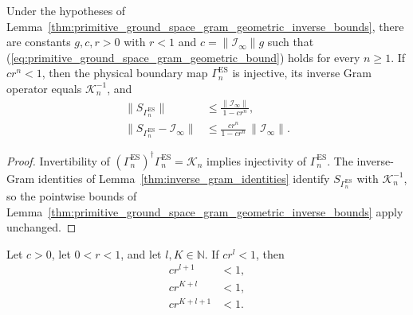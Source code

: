 \begin{lemma}
    \label{thm:primitive_ground_space_map_geometric_inverse_gram_bounds}
    \leanok
    Under the hypotheses of
    Lemma~\ref{thm:primitive_ground_space_gram_geometric_inverse_bounds},
    there are constants $g,c,r>0$ with $r<1$ and
    $c=\lVert\mathcal I_\infty\rVert g$ such that
    (\ref{eq:primitive_ground_space_gram_geometric_bound}) holds for every
    $n\geq1$.  If $cr^n<1$, then the physical boundary map
    $\Gamma_n^{\mathrm{ES}}$ is injective, its inverse Gram operator equals
    $\mathcal K_n^{-1}$, and
    \begin{align}
        \lVert S_{\Gamma_n^{\mathrm{ES}}}\rVert
         & \leq\frac{\lVert\mathcal I_\infty\rVert}{1-cr^n}, \\
        \lVert S_{\Gamma_n^{\mathrm{ES}}}-\mathcal I_\infty\rVert
         & \leq\frac{cr^n}{1-cr^n}\,
        \lVert\mathcal I_\infty\rVert.
    \end{align}
\end{lemma}

\begin{proof}
    \leanok
    Invertibility of
    $(\Gamma_n^{\mathrm{ES}})^\dagger\Gamma_n^{\mathrm{ES}}=\mathcal K_n$
    implies injectivity of $\Gamma_n^{\mathrm{ES}}$. The inverse-Gram
    identities of Lemma~\ref{thm:inverse_gram_identities}
    identify $S_{\Gamma_n^{\mathrm{ES}}}$ with $\mathcal K_n^{-1}$, so the
    pointwise bounds of
    Lemma~\ref{thm:primitive_ground_space_gram_geometric_inverse_bounds} apply
    unchanged.
\end{proof}

\begin{lemma}
    \label{thm:geometric_smallness_at_c3_lengths}
    \leanok
    Let $c>0$, let $0<r<1$, and let $l,K\in\mathbb N$.  If $cr^l<1$,
    then
    \begin{align}
        cr^{l+1}   & <1, \\
        cr^{K+l}   & <1, \\
        cr^{K+l+1} & <1.
    \end{align}
\end{lemma}

